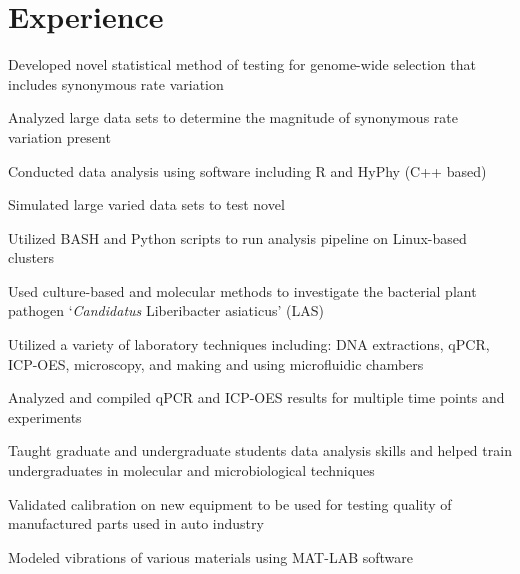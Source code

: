 \documentclass[]{deedy-resume-openfont}
\begin{document}
\begin{minipage}[t]{0.66\textwidth} 


\section{Experience}

\vspace{\topsep} %
\begin{tightemize}
\item {Developed novel statistical method of testing for genome-wide selection that includes synonymous rate variation}
\item {Analyzed large data sets to determine the magnitude of synonymous rate variation present}
\item {Conducted data analysis using software including R and HyPhy (C++ based)}
\item {Simulated large varied data sets to test novel }
\item {Utilized BASH and Python scripts to run analysis pipeline on Linux-based clusters}
\end{tightemize}
\sectionsep

\begin{tightemize}
\item {Used culture-based and molecular methods to investigate the bacterial plant pathogen  ‘\textit{Candidatus} Liberibacter asiaticus’ (LAS)}
\item {Utilized a variety of laboratory techniques including: DNA extractions, qPCR, ICP-OES, microscopy, and making and using microfluidic chambers}
\item Analyzed and compiled qPCR and ICP-OES results for multiple time points and experiments
\item {Taught graduate and undergraduate students data analysis skills and helped train undergraduates in molecular and microbiological techniques }
\end{tightemize}
\sectionsep

\begin{tightemize}
\item {Validated calibration on new equipment to be used for testing quality of manufactured parts used in auto industry}
\item {Modeled vibrations of various materials using MAT-LAB software}
\end{tightemize}
\sectionsep


\end{minipage}
\end{document}
